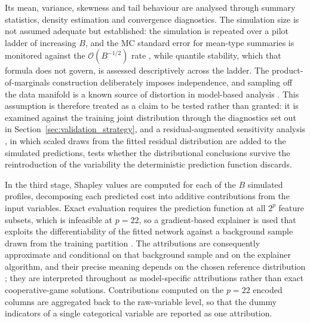 Its mean, variance, skewness and tail behaviour are analysed through
summary statistics, density estimation and convergence diagnostics.  The
simulation size is not assumed adequate but established: the simulation
is repeated over a pilot ladder of increasing $B$, and the MC
standard error for mean-type summaries is monitored against the
$\mathcal{O}(B^{-1/2})$ rate
\citep{caflisch1998monte, glasserman2004monte, owen2013monte}, while
quantile stability, which that formula does not govern, is assessed
descriptively across the ladder.  The product-of-marginals construction
deliberately imposes independence, and sampling off the data manifold is
a known source of distortion in model-based analysis
\citep{aas2021explaining, hooker2021unrestricted}.  This assumption is
therefore treated as a claim to be tested rather than granted: it is
examined against the training joint distribution through the
diagnostics set out in Section~\ref{sec:validation_strategy}, and a
residual-augmented sensitivity analysis
\citep{saltelli2002making}, in which scaled draws from the fitted
residual distribution are added to the simulated predictions, tests
whether the distributional conclusions survive the reintroduction of the
variability the deterministic prediction function discards.

In the third stage, Shapley values
\citep{shapley1953value, lundberg2017unified} are computed for each of
the $B$ simulated profiles, decomposing each predicted cost into additive
contributions from the input variables.  Exact evaluation requires the
prediction function at all $2^p$ feature subsets, which is infeasible at
$p = 22$, so a gradient-based explainer is used that exploits the
differentiability of the fitted network against a background sample drawn
from the training partition \citep{castro2009polynomial}.  The
attributions are consequently approximate and conditional on that
background sample and on the explainer algorithm, and their precise
meaning depends on the chosen reference distribution
\citep{sundararajan2020many, covert2021explaining}; they are interpreted
throughout as model-specific attributions rather than exact
cooperative-game solutions.  Contributions computed on the $p = 22$
encoded columns are aggregated back to the raw-variable level, so that
the dummy indicators of a single categorical variable are reported as one
attribution.

